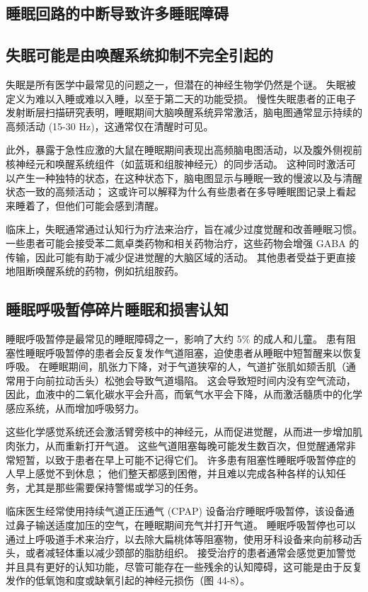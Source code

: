 \subsection{睡眠回路的中断导致许多睡眠障碍}


\subsection{失眠可能是由唤醒系统抑制不完全引起的}
失眠是所有医学中最常见的问题之一，但潜在的神经生物学仍然是个谜。 失眠被定义为难以入睡或难以入睡，以至于第二天的功能受损。 慢性失眠患者的正电子发射断层扫描研究表明，睡眠期间大脑唤醒系统异常激活，脑电图通常显示持续的高频活动 (15-30 Hz)，这通常仅在清醒时可见。

此外，暴露于急性应激的大鼠在睡眠期间表现出高频脑电图活动，以及腹外侧视前核神经元和唤醒系统组件（如蓝斑和组胺神经元）的同步活动。 这种同时激活可以产生一种独特的状态，在这种状态下，脑电图显示与睡眠一致的慢波以及与清醒状态一致的高频活动； 这或许可以解释为什么有些患者在多导睡眠图记录上看起来睡着了，但他们可能会感到清醒。

临床上，失眠通常通过认知行为疗法来治疗，旨在减少过度觉醒和改善睡眠习惯。 一些患者可能会接受苯二氮卓类药物和相关药物治疗，这些药物会增强 GABA 的传输，因此可能有助于减少促进觉醒的大脑区域的活动。 其他患者受益于更直接地阻断唤醒系统的药物，例如抗组胺药。

\subsection{睡眠呼吸暂停碎片睡眠和损害认知}
睡眠呼吸暂停是最常见的睡眠障碍之一，影响了大约 5\% 的成人和儿童。 患有阻塞性睡眠呼吸暂停的患者会反复发作气道阻塞，迫使患者从睡眠中短暂醒来以恢复呼吸。 在睡眠期间，肌张力下降，对于气道狭窄的人，气道扩张肌如颏舌肌（通常用于向前拉动舌头）松弛会导致气道塌陷。 这会导致短时间内没有空气流动，因此，血液中的二氧化碳水平会升高，而氧气水平会下降，从而激活髓质中的化学感应系统，从而增加呼吸努力。

这些化学感觉系统还会激活臂旁核中的神经元，从而促进觉醒，从而进一步增加肌肉张力，从而重新打开气道。 这些气道阻塞每晚可能发生数百次，但觉醒通常非常短暂，以致于患者在早上可能不记得它们。 许多患有阻塞性睡眠呼吸暂停症的人早上感觉不到休息； 他们整天都感到困倦，并且难以完成各种各样的认知任务，尤其是那些需要保持警惕或学习的任务。

临床医生经常使用持续气道正压通气 (CPAP) 设备治疗睡眠呼吸暂停，该设备通过鼻子输送适度加压的空气，在睡眠期间充气并打开气道。 睡眠呼吸暂停也可以通过上呼吸道手术来治疗，以去除大扁桃体等阻塞物，使用牙科设备来向前移动舌头，或者减轻体重以减少颈部的脂肪组织。 接受治疗的患者通常会感觉更加警觉并且具有更好的认知功能，尽管可能存在一些残余的认知障碍，这可能是由于反复发作的低氧饱和度或缺氧引起的神经元损伤（图 44-8）。

